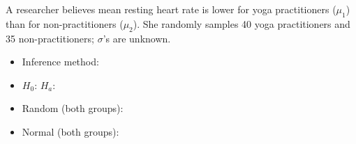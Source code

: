 \documentclass[10pt]{article}
\begin{document}
\begin{practicebox}
A researcher believes mean resting heart rate is lower for yoga practitioners ($\mu_1$) than
for non-practitioners ($\mu_2$). She randomly samples 40 yoga practitioners and 35 non-practitioners;
$\sigma$'s are unknown.

\begin{itemize}
  \item Inference method: \blank{5cm}
  \item $H_0$: \blank{4cm} \quad $H_a$: \blank{4cm}
  \item Random (both groups): \writeline
  \item Normal (both groups): \writeline
\end{itemize}
\end{practicebox}
\end{document}
